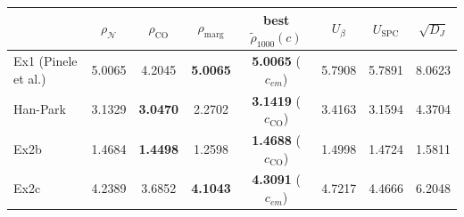 \begin{tabular}{lccccccc}
\toprule
 & $\rho_\mathcal{N}$ & $\rho_{\mathrm{CO}}$ & $\rho_{\mathrm{marg}}$ & best $\tilde\rho_{1000}(c)$ & $U_\beta$ & $U_{\mathrm{SPC}}$ & $\sqrt{D_J}$\\
\midrule
Ex1 (Pinele et al.) & 5.0065 & 4.2045 & \textbf{5.0065} & \textbf{5.0065} ($c_{em}$) & 5.7908 & 5.7891 & 8.0623\\
Han-Park & 3.1329 & \textbf{3.0470} & 2.2702 & \textbf{3.1419} ($c_{\mathrm{CO}}$) & 3.4163 & 3.1594 & 4.3704\\
Ex2b & 1.4684 & \textbf{1.4498} & 1.2598 & \textbf{1.4688} ($c_{\mathrm{CO}}$) & 1.4998 & 1.4724 & 1.5811\\
Ex2c & 4.2389 & 3.6852 & \textbf{4.1043} & \textbf{4.3091} ($c_{em}$) & 4.7217 & 4.4666 & 6.2048\\
\bottomrule
\end{tabular}